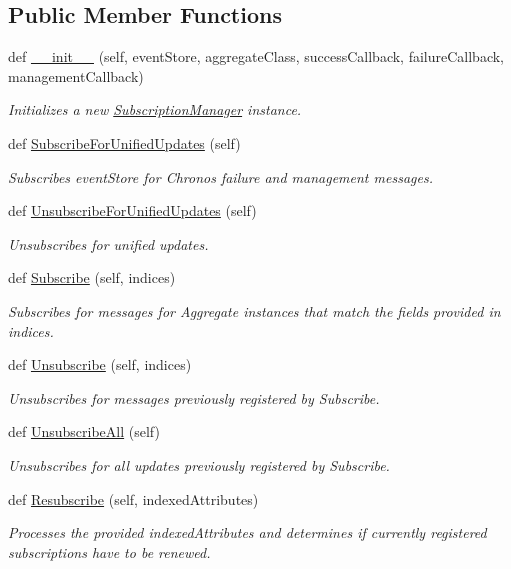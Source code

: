 \subsection*{Public Member Functions}
\begin{DoxyCompactItemize}
\item 
def \hyperlink{group__Chronos_ga17b0ece7d5be132801d46977ffac3bcc}{\+\_\+\+\_\+init\+\_\+\+\_\+} (self, event\+Store, aggregate\+Class, success\+Callback, failure\+Callback, management\+Callback)
\begin{DoxyCompactList}\small\item\em Initializes a new \hyperlink{classChronos_1_1Client_1_1SubscriptionManager}{Subscription\+Manager} instance. \end{DoxyCompactList}\item 
def \hyperlink{group__Chronos_gae21ba8cca5cb7ffe3085e39b9ef18945}{Subscribe\+For\+Unified\+Updates} (self)
\begin{DoxyCompactList}\small\item\em Subscribes {\ttfamily event\+Store} for Chronos failure and management messages. \end{DoxyCompactList}\item 
def \hyperlink{group__Chronos_ga4d1b5c99ac9d282cd4a5b39f5ace3615}{Unsubscribe\+For\+Unified\+Updates} (self)
\begin{DoxyCompactList}\small\item\em Unsubscribes for unified updates. \end{DoxyCompactList}\item 
def \hyperlink{group__Chronos_ga83af8c47b1d510ea2aa638680b9304ed}{Subscribe} (self, indices)
\begin{DoxyCompactList}\small\item\em Subscribes for messages for Aggregate instances that match the fields provided in {\ttfamily indices}. \end{DoxyCompactList}\item 
def \hyperlink{group__Chronos_ga115103720707b543e309432166332e1d}{Unsubscribe} (self, indices)
\begin{DoxyCompactList}\small\item\em Unsubscribes for messages previously registered by Subscribe. \end{DoxyCompactList}\item 
def \hyperlink{group__Chronos_gaef0709e91993c04a0e27eb158e4e8514}{Unsubscribe\+All} (self)
\begin{DoxyCompactList}\small\item\em Unsubscribes for all updates previously registered by Subscribe. \end{DoxyCompactList}\item 
def \hyperlink{group__Chronos_ga8c7e61cf993d0b145642c632f064921d}{Resubscribe} (self, indexed\+Attributes)
\begin{DoxyCompactList}\small\item\em Processes the provided {\ttfamily indexed\+Attributes} and determines if currently registered subscriptions have to be renewed. \end{DoxyCompactList}\end{DoxyCompactItemize}
